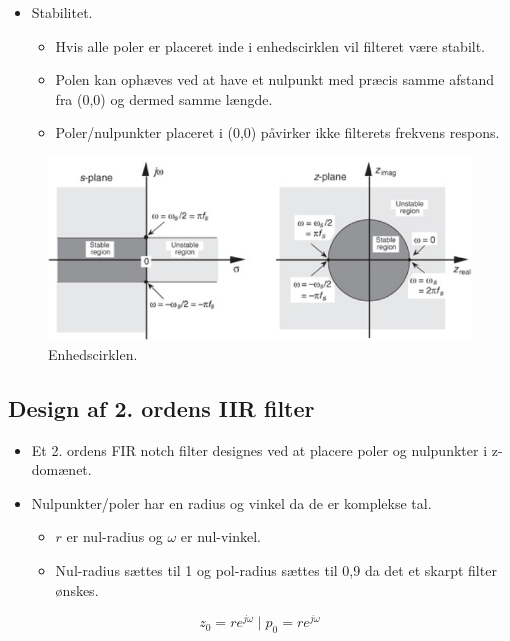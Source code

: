 \documentclass[danish]{article}
\begin{document}
\begin{itemize}
	\item Stabilitet.
	\begin{itemize}
		\item Hvis alle poler er placeret inde i enhedscirklen vil filteret være stabilt.
		\item Polen kan ophæves ved at have et nulpunkt med præcis samme afstand fra (0,0) og dermed samme længde.
		\item Poler/nulpunkter placeret i (0,0) påvirker ikke filterets frekvens respons. 
	\end{itemize}
\end{itemize}

\begin{figure}[H]
	\centering
	\includegraphics[width=0.8\linewidth]{graphics/unitycircle}
	\caption{Enhedscirklen.}
	\label{fig:unitycircle}
\end{figure}

\subsection{Design af 2. ordens IIR filter}
\begin{itemize}
	\item Et 2. ordens FIR notch filter designes ved at placere poler og nulpunkter i z-domænet.
	\item Nulpunkter/poler har en radius og vinkel da de er komplekse tal.
	\begin{itemize}
		\item $r$ er nul-radius og $\omega$ er nul-vinkel.
		\item Nul-radius sættes til 1 og pol-radius sættes til 0,9 da det et skarpt filter ønskes.
	\end{itemize}
\end{itemize}

\begin{equation}
z_0 = r e^{j\omega} \mid p_0 = r e^{j\omega}
\end{equation}
\end{document}
